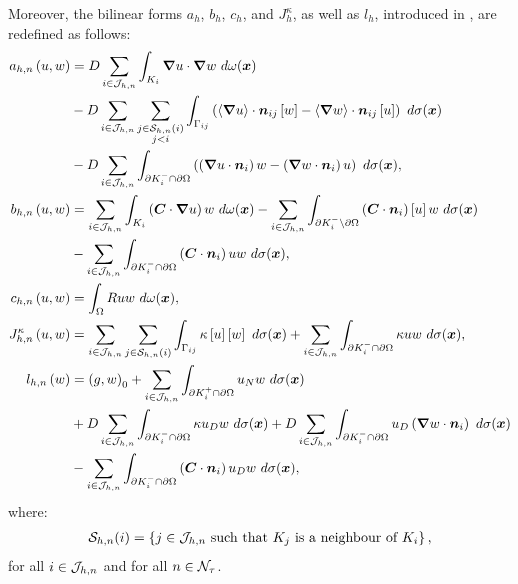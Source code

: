 Moreover, the bilinear forms $a_h$, $b_h$, $c_h$, and $J^{\kappa}_h$, as well as $l_h$, introduced in , are redefined as follows:
\begin{align}
    a_{h, n} \left( u, w \right) &= D \sum_{i \in \mathcal{J}_{h, n}} \int_{K_i} \bm{\nabla} u \cdot \bm{\nabla} w ~ d \omega(\bm{x}) \label{equation:cdr_ahn} \\
    &- D \sum_{i \in \mathcal{J}_{h, n}} \sum_{\substack{j \in \mathcal{S}_{h, n}(i) \\ j < i}} \int_{\Gamma_{ij}} \left( \left\langle \bm{\nabla} u \right\rangle \cdot \bm{n}_{ij} \left[ w \right] - \left\langle \bm{\nabla} w \right\rangle \cdot \bm{n}_{ij} \left[ u \right] \right) ~ d \sigma(\bm{x}) \notag \\
    &- D \sum_{i \in \mathcal{J}_{h, n}} \int_{\partial K_i^- \cap \partial \Omega} \left( \left( \bm{\nabla} u \cdot \bm{n}_i \right) w - \left( \bm{\nabla} w \cdot \bm{n}_i \right) u \right) ~ d \sigma(\bm{x}), \notag \\
    b_{h, n} \left( u, w \right) &= \sum_{i \in \mathcal{J}_{h, n}} \int_{K_i} \left( \bm{C} \cdot \bm{\nabla} u \right) w ~ d \omega(\bm{x}) \label{equation:cdr_bhn} - \sum_{i \in \mathcal{J}_{h, n}} \int_{\partial K_i^- \setminus \partial \Omega} \left( \bm{C} \cdot \bm{n}_i \right) \left[ u \right] w ~ d \sigma(\bm{x}) \\
    &- \sum_{i \in \mathcal{J}_{h, n}} \int_{\partial K_i^- \cap \partial \Omega} \left( \bm{C} \cdot \bm{n}_i \right) u w ~ d \sigma(\bm{x}), \notag \\
    c_{h, n} \left( u, w \right) &= \int_{\Omega} R u w ~ d \omega(\bm{x}), \label{equation:cdr_chn} \\
    J^{\kappa}_{h, n} \left( u, w \right) &= \sum_{i \in \mathcal{J}_{h, n}} \sum_{j \in \mathcal{S}_{h, n}(i)} \int_{\Gamma_{ij}} \kappa \left[ u \right] \left[ w \right] ~ d \sigma(\bm{x}) + \sum_{i \in \mathcal{J}_{h, n}} \int_{\partial K_i^- \cap \partial \Omega} \kappa u w ~ d \sigma(\bm{x}), \label{equation:cdr_jhn} \\
    l_{h, n} \left( w \right)  &= \left( g, w \right)_0 + \sum_{i \in \mathcal{J}_{h, n}} \int_{\partial K_i^+ \cap \partial \Omega} u_N w ~ d \sigma(\bm{x}) \label{equation:cdr_lhn} \\
    &+ D \sum_{i \in \mathcal{J}_{h, n}} \int_{\partial K_i^- \cap \partial \Omega} \kappa u_D w ~ d \sigma(\bm{x}) + D \sum_{i \in \mathcal{J}_{h, n}} \int_{\partial K_i^- \cap \partial \Omega} u_D \left( \bm{\nabla} w \cdot \bm{n}_i \right) ~ d \sigma(\bm{x}) \notag \\
    &- \sum_{i \in \mathcal{J}_{h, n}} \int_{\partial K_i^- \cap \partial \Omega} \left( \bm{C} \cdot \bm{n}_i \right) u_D w ~ d \sigma(\bm{x}) \notag,
\end{align}
where:
\begin{align}
    \mathcal{S}_{h, n}(i) = \left\{ j \in \mathcal{J}_{h, n} \text{ such that } K_j \text{ is a neighbour of } K_i \right\},
\end{align}
for all $i \in \mathcal{J}_{h, n}$ and for all $n \in \mathcal{N}_{\tau}$.

